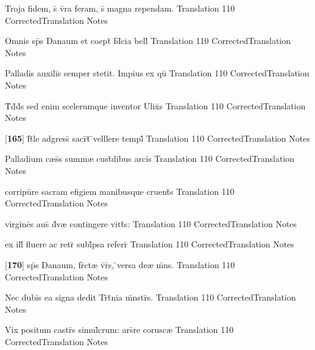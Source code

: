 \latline
  {Troja fidem, s\={\macron {\i}} v\={}ra feram, s\={\macron {\i}} magna rependam.}
  { Translation }
  {110}
  { CorrectedTranslation }
  { Notes }


\latline
  {Omnis sp\={}s Danaum et coept\={\macron {\i}} f\={\macron {\i}}d\={}cia bell\={\macron {\i}}}
  { Translation }
  {110}
  { CorrectedTranslation }
  { Notes }


\latline
  {Palladis auxili\={\macron {\i}}s semper stetit.  Impius ex qu\={}}
  { Translation }
  {110}
  { CorrectedTranslation }
  { Notes }


\latline
  {T\={}d\={\macron {\i}}d\={}s sed enim scelerumque inventor Ulix\={}s}
  { Translation }
  {110}
  { CorrectedTranslation }
  { Notes }


\latline
  {[\textbf{165}] f\={}t\={}le adgress\={\macron {\i}} sacr\={}t\={} \={}velllere templ\={}}
  { Translation }
  {110}
  { CorrectedTranslation }
  { Notes }


\latline
  {Palladium c{\ae}s\={\macron {\i}}s summ{\ae} cust\={}dibus arcis}
  { Translation }
  {110}
  { CorrectedTranslation }
  { Notes }


\latline
  {corripu\={}re sacram efigiem manibusque cruent\={\macron {\i}}s}
  { Translation }
  {110}
  { CorrectedTranslation }
  { Notes }


\latline
  {virgine\={}s aus\={\macron {\i}} d\={\macron {\i}}v{\ae} contingere vitt\={}s:}
  { Translation }
  {110}
  { CorrectedTranslation }
  { Notes }


\latline
  {ex ill\={} fluere ac retr\={} subl\={}psa referr\={\macron {\i}}}
  { Translation }
  {110}
  { CorrectedTranslation }
  { Notes }


\latline
  {[\textbf{170}] sp\={}s Danaum, fr\={}ct{\ae} v\={\macron {\i}}r\={}s, \={}versa de{\ae} m\={}ns.}
  { Translation }
  {110}
  { CorrectedTranslation }
  { Notes }


\latline
  {Nec dubi\={\macron {\i}}s ea signa dedit Tr\={\macron {\i}}t\={}nia m\={}nstr\={\macron {\i}}s.}
  { Translation }
  {110}
  { CorrectedTranslation }
  { Notes }


\latline
  {Vix positum castr\={\macron {\i}}s simul\={}crum: ars\={}re corusc{\ae}}
  { Translation }
  {110}
  { CorrectedTranslation }
  { Notes }


